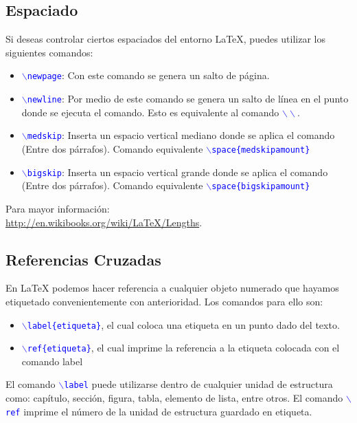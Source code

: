 \subsection{Espaciado}

Si deseas controlar ciertos espaciados del entorno \LaTeX{}, puedes utilizar los siguientes comandos:

\begin{itemize}
 \item  \textcolor{blue}{$\backslash$\texttt{newpage}}: Con este comando se genera un salto de página.
 \item  \textcolor{blue}{$\backslash$\texttt{newline}}: Por medio de este comando se genera un salto de línea en el punto donde se ejecuta el comando. Esto es equivalente al comando \textcolor{blue}{$\backslash\backslash$}.
 \item  \textcolor{blue}{$\backslash$\texttt{medskip}}: Inserta un espacio vertical mediano donde se aplica el comando (Entre dos párrafos). Comando equivalente \textcolor{blue}{$\backslash$\texttt{space\{medskipamount\}}}
  \item  \textcolor{blue}{$\backslash$\texttt{bigskip}}: Inserta un espacio vertical grande donde se aplica el comando (Entre dos párrafos). Comando equivalente \textcolor{blue}{$\backslash$\texttt{space\{bigskipamount\}}}
\end{itemize} 

\noindent Para mayor información:\\
\url{http://en.wikibooks.org/wiki/LaTeX/Lengths}.

\subsection{Referencias Cruzadas}\label{sec:ref}

En \LaTeX{} podemos hacer referencia a cualquier objeto numerado que hayamos etiquetado convenientemente con anterioridad. Los comandos para ello son:
\begin{itemize}
\item \textcolor{blue}{$\backslash$\texttt{label\{etiqueta\}}}, el cual coloca una etiqueta en un punto dado del texto.
\item \textcolor{blue}{$\backslash$\texttt{ref\{etiqueta\}}}, el cual imprime la referencia a la etiqueta colocada con el comando label
\end{itemize}


El comando \textcolor{blue}{$\backslash$\texttt{label}} puede utilizarse dentro de cualquier unidad de estructura como: cap\'{i}tulo, secci\'{o}n, figura, tabla, elemento de lista, entre otros. El comando \textcolor{blue}{$\backslash$\texttt{ref}} imprime el número de la unidad de estructura guardado en etiqueta. 
      

